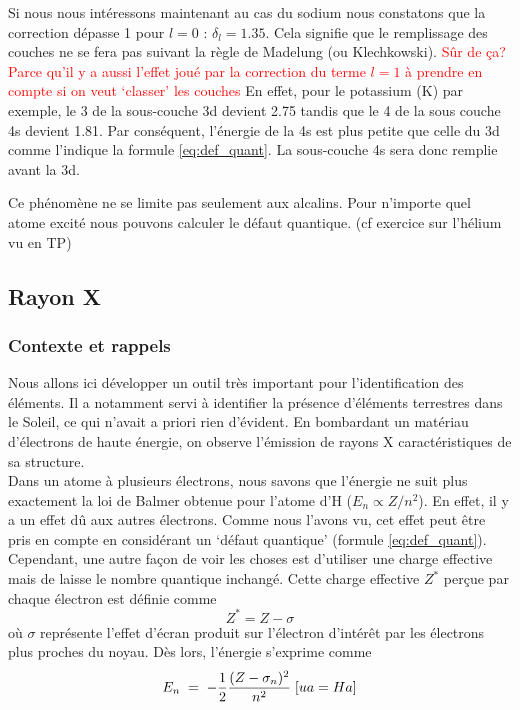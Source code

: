 Si nous nous intéressons maintenant au cas du sodium nous constatons que la correction dépasse 1 pour $l=0$ : $\delta_l = 1.35$. Cela signifie que le remplissage des couches ne se fera pas suivant la règle de Madelung (ou  Klechkowski). \textcolor{red}{Sûr de ça? Parce qu'il y a aussi l'effet joué par la correction du terme $l=1$ à prendre en compte si on veut `classer' les couches}
En effet, pour le potassium (K) par exemple, le 3 de la sous-couche 3d devient 2.75 tandis que le 4 de la sous couche 4s devient 1.81. Par conséquent, l’énergie de la 4s est plus petite que celle du 3d comme l'indique la formule \ref{eq:def_quant}. La sous-couche 4s sera donc remplie avant la 3d.

Ce phénomène ne se limite pas seulement aux alcalins. Pour  n'importe quel atome excité nous pouvons calculer le défaut quantique. (cf exercice sur l'hélium vu en TP)




\subsection{Rayon X}
\subsubsection{Contexte et rappels}


Nous allons ici développer un outil très important pour l'identification des éléments. Il a notamment servi à identifier la présence d'éléments terrestres dans le Soleil, ce qui n'avait a priori rien d'évident. En bombardant un matériau d'électrons de haute énergie, on observe l'émission de rayons X caractéristiques de sa structure.\\

Dans un atome à plusieurs électrons, nous savons que l'énergie ne suit plus exactement la loi de Balmer obtenue pour l'atome d'H ($E_n \propto Z/n^2$). En effet, il y a un effet dû aux autres électrons. Comme nous l'avons vu, cet effet peut être pris en compte en considérant un `défaut quantique' (formule \ref{eq:def_quant}). Cependant, une autre façon de voir les choses est d'utiliser une charge effective mais de laisse le nombre quantique inchangé. Cette charge effective $Z^{*}$ perçue par chaque électron est définie comme $$ Z^{*}=Z-\sigma $$ où $\sigma$ représente l'effet d'écran produit sur l'électron d'intérêt par les électrons plus proches du noyau. Dès lors, l'énergie s'exprime comme
\begin{equation}
    E_n \; = \; -\dfrac{1}{2} \dfrac{(Z-\sigma_n)^2}{n^2} \; [ua = Ha]
    \label{eq:energie_effective}
\end{equation}


